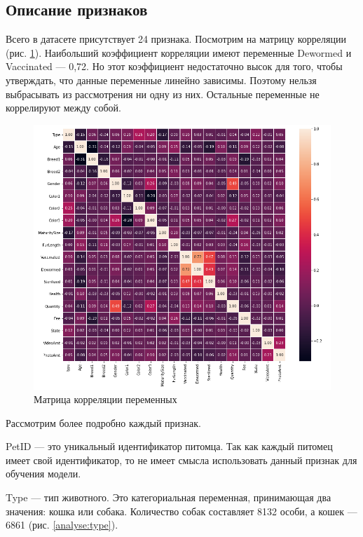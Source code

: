 \documentclass[14pt]{mmcs_article}
\begin{document}
\subsection{Описание признаков}

Всего в датасете присутствует 24 признака. Посмотрим на матрицу корреляции (рис. \ref{analyse:corr}). Наибольший коэффициент корреляции имеют переменные Dewormed и Vaccinated --- 0,72. Но этот коэффициент недостаточно высок для того, чтобы утверждать, что данные переменные линейно зависимы. Поэтому нельзя выбрасывать из рассмотрения ни одну из них. Остальные переменные не коррелируют между собой.

\begin{figure}[H]
	\centering
	\includegraphics[scale=0.55]{corr.png}
	\caption{Матрица корреляции переменных}\label{analyse:corr}
\end{figure}

Рассмотрим более подробно каждый признак.

PetID --- это уникальный идентификатор питомца. Так как каждый питомец имеет свой идентификатор, то не имеет смысла использовать данный признак для обучения модели.

Type --- тип животного. Это категориальная переменная, принимающая два значения: кошка или собака. Количество собак составляет 8132 особи, а кошек — 6861 (рис. \ref{analyse:type}).
\end{document}
